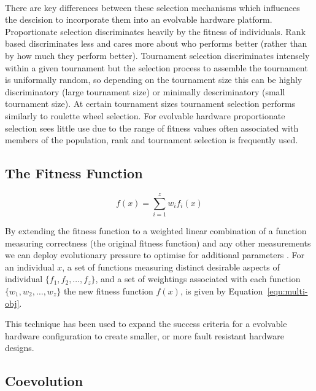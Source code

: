 \paragraph{}
There are key differences between these selection mechanisms which influences
the descision to incorporate them into an evolvable hardware platform. Proportionate
selection discriminates heavily by the fitness of individuals. Rank based
discriminates less and cares more about who performs better (rather than by how
much they perform better). Tournament selection discriminates intensely within a given
tournament but the selection process to assemble the tournament is uniformally
random, so depending on the tournament size this can be highly discriminatory
(large tournament size) or minimally descriminatory (small tournament size).
At certain tournament sizes tournament selection performs similarly to roulette
wheel selection.
For evolvable hardware proportionate selection sees little use due to the range
of fitness values often associated with members of the population, rank and
tournament selection is frequently used.

\subsection{The Fitness Function}

\begin{equation}
	f(x) = \sum_{i=1}^{z} w_i f_i(x)
	\label{equ:multi-obj}
\end{equation}

By extending the fitness function to a weighted linear combination of a function
measuring correctness (the original fitness function)
and any other measurements we can deploy evolutionary pressure to optimise for
additional parameters \cite{deJong:2001:RBP:2955239.2955241}. For an individual
$x$, a set of functions measuring distinct desirable aspects of individual
$\{f_1,f_2,\ldots,f_z\}$, and a set of weightings associated with each function
$\{w_1,w_2,\ldots,w_z\}$ the new fitness function $f(x)$, is given by
Equation~\ref{equ:multi-obj}.

This technique has been used to expand the success criteria for a evolvable hardware configuration
to create smaller, or more fault resistant hardware designs.

\subsection{Coevolution}

